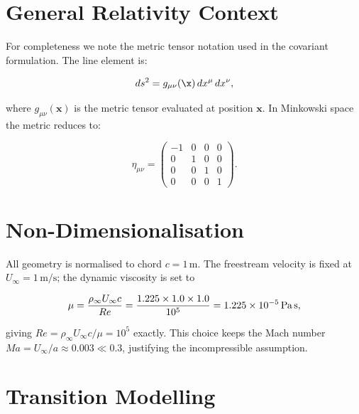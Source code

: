 \documentclass{article}
\begin{document}
\section{General Relativity Context}

For completeness we note the metric tensor notation used in the
covariant formulation.  The line element is:

\begin{equation}
  ds^2 = g_{\mu\nu}(\x)\, dx^\mu \, dx^\nu,
  \label{eq:metric}
\end{equation}

where $g_{\mu\nu}(\mathbf{x})$ is the metric tensor evaluated at position
$\mathbf{x}$.  In Minkowski space the metric reduces to:

\begin{equation}
  \eta_{\mu\nu} =
  \begin{pmatrix}
    -1 & 0 & 0 & 0 \\
     0 & 1 & 0 & 0 \\
     0 & 0 & 1 & 0 \\
     0 & 0 & 0 & 1
  \end{pmatrix}.
  \label{eq:minkowski}
\end{equation}

\section{Non-Dimensionalisation}

All geometry is normalised to chord $c = 1\,\text{m}$.  The freestream
velocity is fixed at $U_\infty = 1\,\text{m/s}$; the dynamic viscosity is
set to

\begin{equation}
  \mu = \frac{\rho_\infty U_\infty c}{Re}
      = \frac{1.225 \times 1.0 \times 1.0}{10^5}
      = 1.225 \times 10^{-5}\,\text{Pa\,s},
\end{equation}

giving $Re = \rho_\infty U_\infty c / \mu = 10^5$ exactly.  This choice
keeps the Mach number $Ma = U_\infty / a \approx 0.003 \ll 0.3$,
justifying the incompressible assumption.

\section{Transition Modelling}
\end{document}
